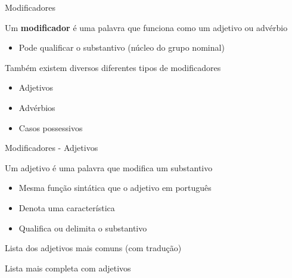 \documentclass[compress,mathserif,xcolor=table]{beamer}
\begin{document}
\begin{frame}{Modificadores}

Um \textbf{modificador} é uma palavra que funciona como um adjetivo ou advérbio
\begin{itemize}
    \item Pode qualificar o substantivo (núcleo do grupo nominal)
\end{itemize}

\vspace{0.5cm}

Também existem diversos diferentes tipos de modificadores
\begin{itemize}
    \item Adjetivos
    \item Advérbios
    \item Casos possessivos
\end{itemize}
\end{frame}


\begin{frame}{Modificadores - Adjetivos}

Um adjetivo é uma palavra que modifica um substantivo
\begin{itemize}
    \item Mesma função sintática que o adjetivo em português
    \item Denota uma característica 
    \item Qualifica ou delimita o substantivo
\end{itemize}

\vspace{0.5cm}

Lista dos adjetivos mais comuns (com tradução) \href{https://www.berlitz.com/pt-br/blog/60-adjetivos-em-ingles-para-ampliar-seu-vocabulario}{}

Lista mais completa com adjetivos \href{https://www.paperrater.com/page/lists-of-adjectives}{}

\end{frame}

\end{document}
